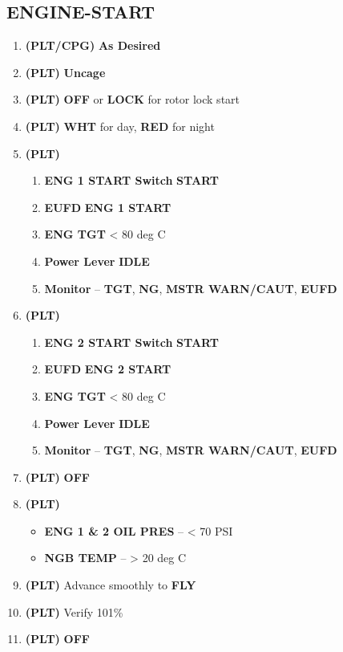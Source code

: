 \documentclass[fontInter]{TechCheck}
\begin{document}
	\subsection{ENGINE-START}
	\begin{enumerate}[leftmargin=0.1\linewidth,rightmargin=0.1\linewidth, itemsep=4pt]
		\item {} \textbf{(PLT/CPG)} \dotfill \textbf{As Desired}
		\item {} \textbf{(PLT)} \dotfill \textbf{Uncage}
		\item {} \textbf{(PLT)} \dotfill \textbf{OFF}  or \textbf{LOCK} for rotor lock start
		\item {} \textbf{(PLT)} \dotfill \textbf{WHT} for day, \textbf{RED} for night 
		\item {} \textbf{(PLT)}
		\begin{enumerate}[itemsep=4pt]
			\item \textbf{ENG 1 START Switch} \dotfill \textbf{START}
			\item \textbf{EUFD} \dotfill \textbf{ENG 1 START}
			\item \textbf{ENG TGT} \dotfill < 80 deg C
			\item \textbf{Power Lever} \dotfill \textbf{IDLE}
			\item \textbf{Monitor} -- \textbf{TGT}, \textbf{NG}, \textbf{MSTR WARN/CAUT}, \textbf{EUFD}
		\end{enumerate}
		\item {} \textbf{(PLT)}
		\begin{enumerate}[itemsep=4pt]
			\item \textbf{ENG 2 START Switch} \dotfill \textbf{START}
			\item \textbf{EUFD} \dotfill \textbf{ENG 2 START}
			\item \textbf{ENG TGT} \dotfill < 80 deg C
			\item \textbf{Power Lever} \dotfill \textbf{IDLE}
			\item \textbf{Monitor} -- \textbf{TGT}, \textbf{NG}, \textbf{MSTR WARN/CAUT}, \textbf{EUFD}
		\end{enumerate}
		\item {} \textbf{(PLT)} \dotfill \textbf{OFF} 
		\item {} \textbf{(PLT)}
		\begin{itemize}[itemsep=4pt]
			\item \textbf{ENG 1 \& 2 OIL PRES} -- < 70 PSI
			\item \textbf{NGB TEMP} -- > 20 deg C
		\end{itemize}
		\item {} \textbf{(PLT)} \dotfill Advance smoothly to \textbf{FLY} 
		\item {} \textbf{(PLT)} \dotfill Verify 101\% 
		\item {} \textbf{(PLT)} \dotfill \textbf{OFF}
	\end{enumerate}
\end{document}
